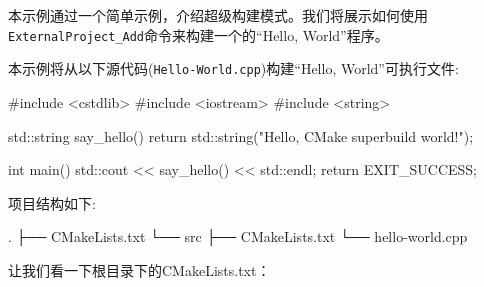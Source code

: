 本示例通过一个简单示例，介绍超级构建模式。我们将展示如何使用\texttt{ExternalProject\_Add}命令来构建一个的“Hello, World”程序。


本示例将从以下源代码(\texttt{Hello-World.cpp})构建“Hello, World”可执行文件:

\begin{codebox}[cpp]
#include <cstdlib>
#include <iostream>
#include <string>

std::string say_hello() { return std::string("Hello, CMake superbuild world!"); }

int main()
{
  std::cout << say_hello() << std::endl;
  return EXIT_SUCCESS;
}
\end{codebox}

项目结构如下:

\begin{codebox}[shell]
.
├── CMakeLists.txt
└── src
      ├── CMakeLists.txt
      └── hello-world.cpp
\end{codebox}


让我们看一下根目录下的CMakeLists.txt：

